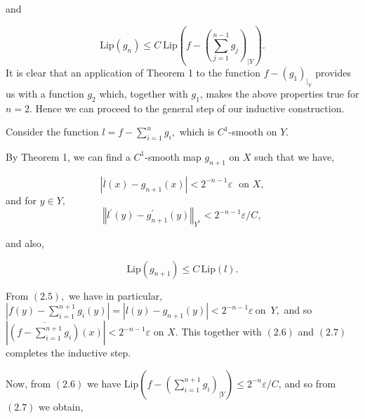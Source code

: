 \documentclass[11pt]{amsproc}%
\theoremstyle{plain}
\numberwithin{equation}{section}
\begin{document}
\medskip

\noindent and%

\[
\text{Lip}(g_{n})\leq C\ \text{Lip}\left(  f-(\sum_{j=1}^{n-1}{g_{j}}%
)_{|Y}\right)  .
\]
It is clear that an application of Theorem 1 to the function $f-(g_{1}%
)_{|_{Y}}$ provides us with a function $g_{2}$ which, together with $g_{1}$,
makes the above properties true for $n=2$. Hence we can proceed to the general
step of our inductive construction.

\medskip

\noindent Consider the function $l=f-\sum_{i=1}^{n}g_{i},$ which is $C^{1}%
$-smooth on $Y.$

\medskip

\noindent By Theorem 1, we can find a $C^{1}$-smooth map $g_{n+1}$ on $X$ such
that we have,

\medskip%

\begin{equation}
\left\vert \overline{l}\left(  x\right)  -g_{n+1}\left(  x\right)  \right\vert
<2^{-n-1}\varepsilon\,\,\text{ on\ }X,
\end{equation}
\noindent and for $y\in Y,$
\begin{equation}
\left\Vert l^{\prime}\left(  y\right)  -g_{n+1}^{\prime}\left(  y\right)
\right\Vert _{Y^{\ast}}<2^{-n-1}\varepsilon/C,
\end{equation}


\noindent and also,%

\begin{equation}
\text{Lip}\left(  g_{n+1}\right)  \leq C\,\text{Lip}\left(  l\right)  .
\end{equation}


\medskip

\noindent From $\left(  2.5\right)  ,$ we have in particular, $\left\vert
f\left(  y\right)  -\sum_{i=1}^{n+1}g_{i}\left(  y\right)  \right\vert
=\left\vert l\left(  y\right)  -g_{n+1}\left(  y\right)  \right\vert
<2^{-n-1}\varepsilon\ $on\ $Y,$ and so $\left\vert \overline{\left(
f-\sum_{i=1}^{n+1}g_{i}\right)  }\left(  x\right)  \right\vert <2^{-n-1}%
\varepsilon$ on $X.$ This together with $\left(  2.6\right)  $ and $\left(
2.7\right)  $ completes the inductive step.

\medskip

\noindent Now, from $\left(  2.6\right)  $ we have $\text{Lip}\left(
f-(\sum_{i=1}^{n+1}g_{i})_{|Y}\right)  \leq2^{-n}\varepsilon/C$, and so from
$\left(  2.7\right)  $ we obtain,%
\end{document}
